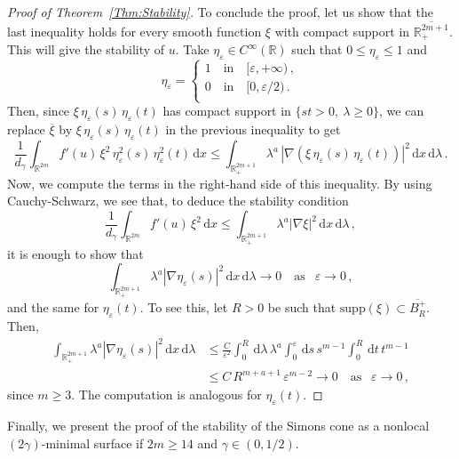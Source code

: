 \documentclass[12pt,reqno]{amsart}
\theoremstyle{definition}
\theoremstyle{remark}
\newcommand{\con}[1]{\mathbb{#1}}
\newcommand{\R}{\con{R}} %
\newcommand{\s}{\gamma}
\renewcommand{\d}{\,\mathrm{d}} %
\numberwithin{equation}{section}
\begin{document}
\begin{proof}[Proof of Theorem~\ref{Thm:Stability}]
To conclude the proof, let us show that the last inequality holds for every smooth function $\xi$ with compact support in $\overline{\R^{2m+1}_+}$. This will give the stability of $u$. Take $\eta_\varepsilon\in C^\infty(\R)$ such that $0\leq \eta_\varepsilon \leq 1$ and
$$ \eta_\varepsilon = \begin{cases}
1 \ \ \ \text{ in } \ \ \ [\varepsilon, +\infty)\,,\\
0 \ \ \ \text{ in } \ \ \ [0, \varepsilon/2)\,.\\
\end{cases} $$
Then, since $\xi\,\eta_\varepsilon(s)\,\eta_\varepsilon(t)$ has compact support in $\{st>0, \ \lambda \geq 0\}$, we can replace $\overline{\xi}$ by $\xi\,\eta_\varepsilon(s)\,\eta_\varepsilon(t)$ in the previous inequality to get
$$
\frac{1}{d_\s}\int_{\R^{2m}} f'(u)\,\xi^2\,\eta_\varepsilon^2(s)\,\eta_\varepsilon^2(t) \d x \leq \int_{\R^{2m+1}_+} \lambda^a\,|\nabla (\xi\,\eta_\varepsilon(s)\,\eta_\varepsilon(t))|^2 \d x \d \lambda\,. $$
Now, we compute the terms in the right-hand side of this inequality. By using Cauchy-Schwarz, we see that, to deduce the stability condition 
$$
\frac{1}{d_\s}\int_{\R^{2m}} f'(u)\,\xi^2 \d x  
\leq \int_{\R^{2m+1}_+} \lambda^a |\nabla \xi|^2  \d x \d \lambda\,,
$$
it is enough to show that
$$ \int_{\R^{2m+1}_+} \lambda^a|\nabla\eta_\varepsilon(s)|^2 \d x \d \lambda  \to 0 \ \ \ \text{ as } \ \ \varepsilon \to 0\,,$$
and the same for $\eta_\varepsilon(t)$. To see this, let $R>0$ be such that $\text{supp}(\xi)\subset \overline{B_R^+}$. Then,
\begin{align*}
\int_{\R^{2m+1}_+} \lambda^a|\nabla\eta_\varepsilon(s)|^2 \d x \d \lambda &\leq \frac{C}{\varepsilon^2} \int_0^R \d \lambda \, \lambda^a \int_0^\varepsilon \d s \, s^{m-1} \int_0^R \d t \,t^{m-1} \\
&\leq C\,R^{m+a+1}\,\varepsilon^{m-2} \to 0 \ \ \ \text{ as } \ \ \varepsilon \to 0\,,
\end{align*}
since $m\geq 3$. The computation is analogous for $\eta_\varepsilon(t)$.
\end{proof}

Finally, we present the proof of the stability of the Simons cone as a nonlocal $(2\s)$-minimal surface if $2m\geq 14$ and $\s\in(0,1/2)$.
\end{document}
